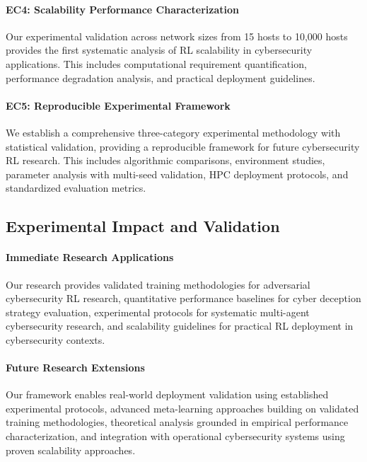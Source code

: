 \documentclass[12pt,oneside]{article}
\begin{document}
\paragraph{EC4: Scalability Performance Characterization}
Our experimental validation across network sizes from 15 hosts to 10,000 hosts provides the first systematic analysis of RL scalability in cybersecurity applications. This includes computational requirement quantification, performance degradation analysis, and practical deployment guidelines.

\paragraph{EC5: Reproducible Experimental Framework}
We establish a comprehensive three-category experimental methodology with statistical validation, providing a reproducible framework for future cybersecurity RL research. This includes algorithmic comparisons, environment studies, parameter analysis with multi-seed validation, HPC deployment protocols, and standardized evaluation metrics.

\subsection{Experimental Impact and Validation}

\paragraph{Immediate Research Applications} Our research provides validated training methodologies for adversarial cybersecurity RL research, quantitative performance baselines for cyber deception strategy evaluation, experimental protocols for systematic multi-agent cybersecurity research, and scalability guidelines for practical RL deployment in cybersecurity contexts.

\paragraph{Future Research Extensions} Our framework enables real-world deployment validation using established experimental protocols, advanced meta-learning approaches building on validated training methodologies, theoretical analysis grounded in empirical performance characterization, and integration with operational cybersecurity systems using proven scalability approaches.



\clearpage
\end{document}
